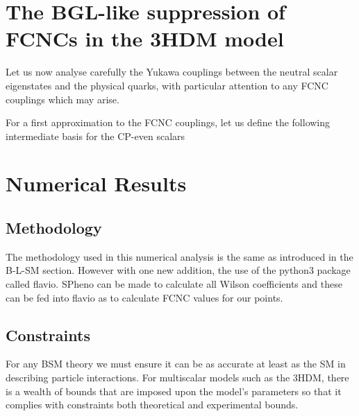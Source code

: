 
\section{The BGL-like suppression of FCNCs in the 3HDM model}

Let us now analyse carefully the Yukawa couplings between the neutral scalar
eigenstates and the physical quarks, with particular attention to any FCNC couplings which may arise.

For a first approximation to the FCNC couplings, let us define the following intermediate basis for the CP-even scalars


\section{Numerical Results}
\subsection{Methodology}

The methodology used in this numerical analysis is the same as introduced in the B-L-SM section. However with one new addition, the use of the python3 package called flavio. SPheno can be made to calculate all Wilson coefficients and these can be fed into flavio as to calculate FCNC values for our points.  

\subsection{Constraints}

For any BSM theory we must ensure it can be as accurate at least as the SM in describing particle interactions. For multiscalar models such as the 3HDM, there is a wealth of bounds that are imposed upon the model’s parameters so that it complies with constraints both theoretical and experimental bounds. 

